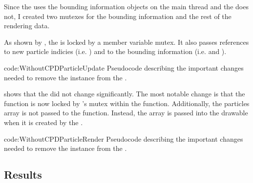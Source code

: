 \addtocounter{footnote}{-1}
\addtocounter{footnote}{+1}

Since the  uses the bounding information objects on the main thread and the  does not, I created two mutexes for the bounding information and the rest of the rendering data. 

As shown by , the  is locked by a member variable mutex. It also passes references to new particle indicies (i.e. ) and to the bounding information (i.e.  and ).

\vspace{-0.5cm}
{code:WithoutCPDParticleUpdate}
{Pseudocode describing the important changes needed to remove the  instance from the .}
\vspace{-0.5cm}

 shows that the  did not change significantly. The most notable change is that the  function is now locked by 's mutex within the  function. Additionally, the particles array is not passed to the  function. Instead, the array is passed into the drawable when it is created by the .

\vspace{-0.5cm}
{code:WithoutCPDParticleRender}
{Pseudocode describing the important changes needed to remove the  instance from the .}
\vspace{-0.7cm}

\subsection{Results}\label{ssec:observe_copies_results}


